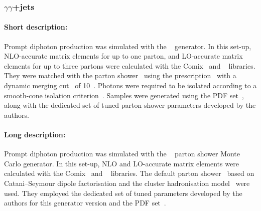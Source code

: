 

\subsubsection[yy+jets]{ $\gamma\gamma$+jets}

\paragraph{Short description:}

Prompt diphoton production was simulated with the
\SHERPA[2.2]~\cite{Bothmann:2019yzt} generator. In this set-up, NLO-accurate
matrix elements for up to one parton, and LO-accurate matrix elements for up
to three partons were calculated with the Comix~\cite{Gleisberg:2008fv} and
\OPENLOOPS~\cite{Buccioni:2019sur,Cascioli:2011va,Denner:2016kdg} libraries. They were matched
with the \SHERPA parton shower~\cite{Schumann:2007mg} using the \MEPSatNLO
prescription~\cite{Hoeche:2011fd,Hoeche:2012yf,Catani:2001cc,Hoeche:2009rj}
with a dynamic merging cut~\cite{Siegert:2016bre} of 10~\GeV.
Photons were required to be isolated according to a smooth-cone isolation
criterion~\cite{Frixione:1998jh}. Samples were generated using the
\NNPDF[3.0nnlo] PDF set~\cite{Ball:2014uwa}, along with the dedicated set of tuned
parton-shower parameters developed by the \SHERPA authors.


\paragraph{Long description:}

Prompt diphoton production was simulated with the
\SHERPA[2.2]~\cite{Bothmann:2019yzt} parton shower Monte Carlo
generator. In this set-up, NLO and LO-accurate
matrix elements were calculated with the Comix~\cite{Gleisberg:2008fv} and
\OPENLOOPS~\cite{Buccioni:2019sur,Cascioli:2011va,Denner:2016kdg} libraries.
The default \SHERPA parton shower~\cite{Schumann:2007mg} based on
Catani--Seymour dipole factorisation and the cluster hadronisation model~\cite{Winter:2003tt}
were used. They employed the dedicated set of tuned parameters developed by the
\SHERPA authors for this generator version and the \NNPDF[3.0nnlo]
PDF set~\cite{Ball:2014uwa}.

